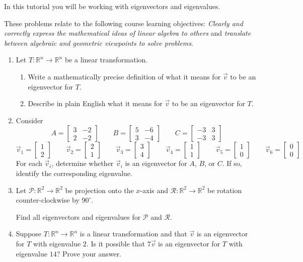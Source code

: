 \documentclass[red]{tutorial}
\newcommand{\R}{\mathbb{R}}
\newcommand{\mat}[1]{\begin{bmatrix}#1\end{bmatrix}}
\theoremstyle{definition}
\theoremstyle{theorem}
\begin{document}
	\begin{tutorial}

		\begin{objectives}
	In this tutorial you will be working with eigenvectors and eigenvalues.

	These problems relate to the following course learning objectives:
			\textit{Clearly and correctly express the mathematical ideas of linear algebra to others}
			and \textit{translate between algebraic and geometric viewpoints to solve problems}.
		\end{objectives}


\begin{enumerate}
	\item Let $T:\R^n\to\R^n$ be a linear transformation.
	\begin{enumerate}
		\item Write a mathematically precise definition of what it means for $\vec v$ to be an eigenvector
			for $T$.
		\item Describe in plain English what it means for $\vec v$ to be an eigenvector for $T$.
	\end{enumerate}
	\item Consider
		\[
			A=\mat{3&-2\\2&-2}\qquad
			B=\mat{5&-6\\3&-4}\qquad
			C=\mat{-3&3\\-3&3}
		\]
		\[
			\vec v_1=\mat{1\\2}\qquad
			\vec v_2=\mat{2\\1}\qquad
			\vec v_3=\mat{3\\4}\qquad
			\vec v_4=\mat{1\\1}\qquad
			\vec v_5=\mat{1\\0}\qquad
			\vec v_6=\mat{0\\0}
		\]
		For each $\vec v_i$, determine whether $\vec v_i$ is an eigenvector for $A$, $B$, or $C$. If so,
		identify the corresponding eigenvalue.
	\item Let $\mathcal P:\R^2\to\R^2$ be projection onto the $x$-axis and $\mathcal R:\R^2\to\R^2$ be rotation
		counter-clockwise by $90^\circ$.

		Find all eigenvectors and eigenvalues for $\mathcal P$ and $\mathcal R$.
	\item Suppose $T:\R^n\to\R^n$ is a linear transformation and that $\vec v$ is an eigenvector for
		$T$ with eigenvalue $2$. Is it possible that $7\vec v$ is an eigenvector for $T$ with eigenvalue
		$14$? Prove your answer.


\end{enumerate}
\end{tutorial}
\end{document}

